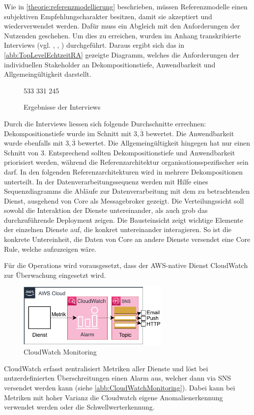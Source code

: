 Wie in \autoref{theorie:referenzmodellierung} beschrieben, müssen Referenzmodelle einen subjektiven Empfehlungscharakter besitzen, damit sie akzeptiert und wiederverwendet werden. Dafür muss ein Abgleich mit den Anforderungen der Nutzenden geschehen. Um dies zu erreichen, wurden im Anhang transkribierte Interviews (vgl. , , ) durchgeführt. Daraus ergibt sich das in \autoref{abb:TopLevelEchtzeitRA} gezeigte Diagramm, welches die Anforderungen der individuellen Stakeholder an Dekompositionstiefe, Anwendbarkeit und Allgemeingültigkeit darstellt.

\begin{figure}[H]
\centering
\spideroverview
{5}{3}{3}
{3}{3}{1}
{2}{4}{5}
\caption{Ergebnisse der Interviews}
\label{abb:DimensionenUebersicht}
\end{figure}
Durch die Interviews liessen sich folgende Durchschnitte errechnen: Dekompositionstiefe wurde im Schnitt mit $3,\overline{3}$ bewertet. Die Anwendbarkeit wurde ebenfalls mit $3,\overline{3}$ bewertet. Die Allgemeingültigkeit hingegen hat nur einen Schnitt von $3$. Entsprechend sollten Dekompositionstiefe und Anwendbarkeit priorisiert werden, während die Referenzarchitektur organisationsspezifischer sein darf. 
In den folgenden Referenzarchitekturen wird in mehrere Dekompositionen unterteilt. In der Datenverarbeitungssequenz werden mit Hilfe eines Sequenzdiagramms die Abläufe zur Datenverarbeitung mit dem zu betrachtenden Dienst, ausgehend von \AWSIOT{} Core als Messagebroker gezeigt.
Die Verteilungssicht soll sowohl die Interaktion der Dienste untereinander, als auch grob das durchzuführende Deployment zeigen. Die Bausteinsicht zeigt wichtige Elemente der einzelnen Dienste auf, die konkret untereinander interagieren. So ist die konkrete Untereinheit, die Daten von \AWSIOT{} Core an andere Dienste versendet eine \AWSIOT{} Core Rule, welche aufzuzeigen wäre. 

Für die Operations wird vorausgesetzt, dass der \ac{AWS}-native Dienst CloudWatch zur Überwachung eingesetzt wird. 
\begin{figure}[H]
\centering
\includegraphics[width=0.66\textwidth]{graphics/CloudWatch-Monitoring}
\caption{CloudWatch Monitoring}
\label{abb:CloudWatchMonitoring}
\end{figure}
CloudWatch erfasst zentralisiert Metriken aller Dienste und löst bei nutzerdefinierten Überschreitungen einen Alarm aus, welcher dann via \ac{SNS} versendet werden kann (siehe \autoref{abb:CloudWatchMonitoring}). Dabei kann bei Metriken mit hoher Varianz die Cloudwatch eigene Anomalienerkennung verwendet werden oder die Schwellwerterkennung.



